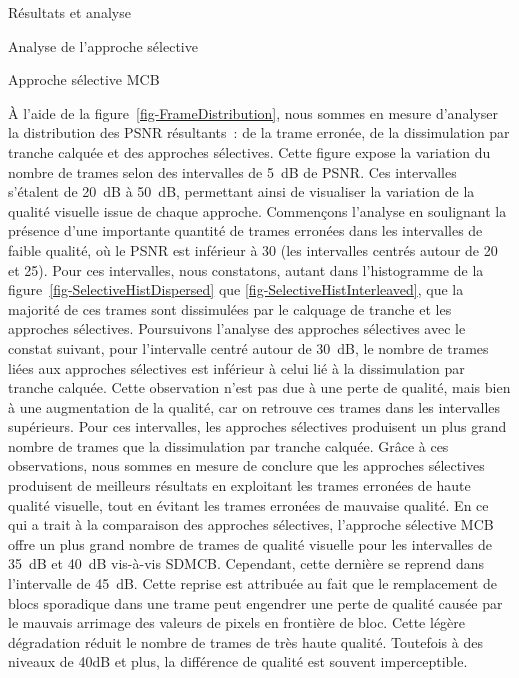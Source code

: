 \documentclass[letterpaper, twoside, 12pt,memoire]{thETS}
\newcommand{\fig}[1]{figure~\ref{#1}}
\begin{document}
\begin{chapter}{Résultats et analyse}
\begin{section}{Analyse de l'approche sélective}
\begin{subsection}{Approche sélective MCB}
\end{subsection}

À l'aide de la \fig{fig-FrameDistribution}, nous sommes en mesure d'analyser la
distribution des PSNR résultants~: de la trame erronée, de la dissimulation par
tranche calquée et des approches sélectives. Cette figure expose la variation du
nombre de trames selon des intervalles de 5~dB de PSNR. Ces intervalles
s'étalent de 20~dB à 50~dB, permettant ainsi de visualiser la variation de la
qualité visuelle issue de chaque approche. Commençons l'analyse en soulignant la
présence d'une importante quantité de trames erronées dans les intervalles de
faible qualité, où le PSNR est inférieur à 30 (les intervalles centrés autour de
20 et 25). Pour ces intervalles, nous constatons, autant dans l'histogramme de
la \fig{fig-SelectiveHistDispersed} que \ref{fig-SelectiveHistInterleaved}, que
la majorité de ces trames sont dissimulées par le calquage de tranche et les
approches sélectives. Poursuivons l'analyse des approches sélectives avec le
constat suivant, pour l'intervalle centré autour de 30~dB, le nombre de trames
liées aux approches sélectives est inférieur à celui lié à la dissimulation par
tranche calquée. Cette observation n'est pas due à une perte de qualité, mais
bien à une augmentation de la qualité, car on retrouve ces trames dans les
intervalles supérieurs. Pour ces intervalles, les approches sélectives
produisent un plus grand nombre de trames que la dissimulation par tranche
calquée. Grâce à ces observations, nous sommes en mesure de conclure que les
approches sélectives produisent de meilleurs résultats en exploitant les trames
erronées de haute qualité visuelle, tout en évitant les trames erronées de
mauvaise qualité. En ce qui a trait à la comparaison des approches sélectives,
l'approche sélective MCB offre un plus grand nombre de trames de qualité
visuelle pour les intervalles de 35~dB et 40~dB vis-à-vis SDMCB. Cependant,
cette dernière se reprend dans l'intervalle de 45~dB. Cette reprise est
attribuée au fait que le remplacement de blocs sporadique dans une trame peut
engendrer une perte de qualité causée par le mauvais arrimage des valeurs de
pixels en frontière de bloc. Cette légère dégradation réduit le nombre de trames
de très haute qualité. Toutefois à des niveaux de 40dB et plus, la différence de
qualité est souvent imperceptible.


\end{section}
\end{chapter}
\end{document}
